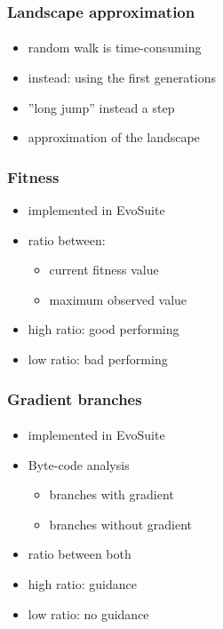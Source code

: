 \begin{frame}
	\frametitle{Landscape approximation}
	\framesubtitle{\cite{Kauffman.1987}}
	
	\begin{itemize}
		\item random walk is time-consuming
		\item instead: using the first generations
		\item ''long jump'' instead a step 
		\item approximation of the landscape
	\end{itemize}
	
\end{frame}

\begin{frame}
	\frametitle{Fitness}
	
	\begin{itemize}
		\item implemented in EvoSuite
		\item ratio between:
		\begin{itemize}
			\item current fitness value
			\item maximum observed value
		\end{itemize}
		\item high ratio: good performing
		\item low ratio: bad performing
	\end{itemize}
	
\end{frame}

\begin{frame}
	\frametitle{Gradient branches}
	\framesubtitle{\cite{Shamshiri.2015}}
	
	\begin{itemize}
		\item implemented in EvoSuite
		\item Byte-code analysis
		\begin{itemize}
			\item branches with gradient
			\item branches without gradient
		\end{itemize}
		\item ratio between both
		\item high ratio: guidance
		\item low ratio: no guidance
	\end{itemize}
	
\end{frame}


